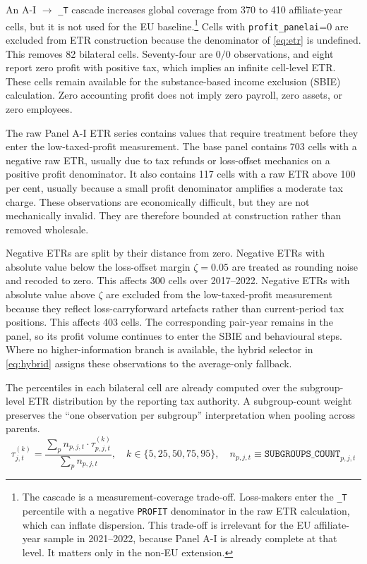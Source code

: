 \documentclass[11pt,a4paper]{article}
\newcommand{\code}[1]{\texttt{#1}}
\begin{document}
An A-I $\rightarrow$ \code{\_T} cascade increases global coverage from 370 to 410 affiliate-year cells, but it is not used for the EU baseline.\footnote{The cascade is a measurement-coverage trade-off. Loss-makers enter the \code{\_T} percentile with a negative \code{PROFIT} denominator in the raw ETR calculation, which can inflate dispersion. This trade-off is irrelevant for the EU affiliate-year sample in 2021--2022, because Panel A-I is already complete at that level. It matters only in the non-EU extension.} Cells with \code{profit\_panelai}=0 are excluded from ETR construction because the denominator of \eqref{eq:etr} is undefined. This removes 82 bilateral cells. Seventy-four are $0/0$ observations, and eight report zero profit with positive tax, which implies an infinite cell-level ETR. These cells remain available for the substance-based income exclusion (SBIE) calculation. Zero accounting profit does not imply zero payroll, zero assets, or zero employees.

The raw Panel A-I ETR series contains values that require treatment before they enter the low-taxed-profit measurement. The base panel contains 703 cells with a negative raw ETR, usually due to tax refunds or loss-offset mechanics on a positive profit denominator. It also contains 117 cells with a raw ETR above 100 per cent, usually because a small profit denominator amplifies a moderate tax charge. These observations are economically difficult, but they are not mechanically invalid. They are therefore bounded at construction rather than removed wholesale.

Negative ETRs are split by their distance from zero. Negative ETRs with absolute value below the loss-offset margin $\zeta=0.05$ are treated as rounding noise and recoded to zero. This affects 300 cells over 2017--2022. Negative ETRs with absolute value above $\zeta$ are excluded from the low-taxed-profit measurement because they reflect loss-carryforward artefacts rather than current-period tax positions. This affects 403 cells. The corresponding pair-year remains in the panel, so its profit volume continues to enter the SBIE and behavioural steps. Where no higher-information branch is available, the hybrid selector in \eqref{eq:hybrid} assigns these observations to the average-only fallback.

The percentiles in each bilateral cell are already computed over the subgroup-level ETR distribution by the reporting tax authority. A subgroup-count weight preserves the ``one observation per subgroup'' interpretation when pooling across parents.
\begin{equation}\label{eq:jurisdiction_percentile}
\tau_{j,t}^{(k)} = \frac{\sum_p n_{p,j,t} \cdot \tau_{p,j,t}^{(k)}}{\sum_p n_{p,j,t}}, \quad k \in \{5, 25, 50, 75, 95\}, \quad n_{p,j,t} \equiv \code{SUBGROUPS\_COUNT}_{p,j,t}
\end{equation}
\end{document}
